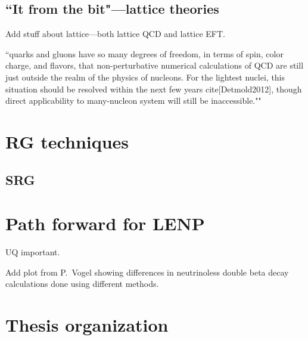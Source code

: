 	\subsection{``It from the bit"---lattice theories}
	\label{sec:lattice_QCD}

	Add stuff about lattice---both lattice QCD and lattice EFT.

	``quarks and gluons have so many degrees of freedom, in terms of spin,
	color charge, and flavors, that non-perturbative numerical calculations of
	QCD are still just outside the realm of the physics of nucleons. For the
	lightest nuclei, this situation should be resolved within the next few years
	cite[Detmold2012], though direct applicability to many-nucleon system will
	still be inaccessible.""

	\section{RG techniques}

	\subsection{SRG}
	\label{subsec:SRG_intro}



	\section{Path forward for LENP}

	UQ important.

	Add plot from P.\ Vogel showing differences in neutrinoless double beta decay
	calculations done using different methods.

	\section{Thesis organization}
